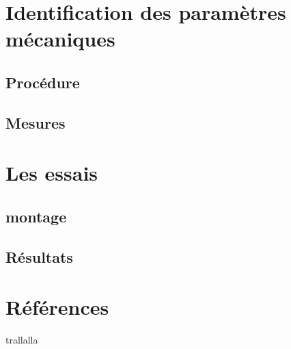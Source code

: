 \documentclass{DGC_M2_report}
\begin{document}
\chapter{Identification des paramètres mécaniques
}
\section{Procédure}


\section{Mesures}


\chapter{Les essais}
\section{montage}


\section{Résultats}


\chapter*{Références}
trallalla
\end{document}
